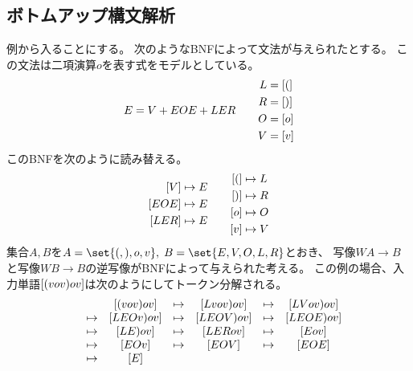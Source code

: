 \subsection{ボトムアップ構文解析}\label{s2:ボトムアップ構文解析} %
	例から入ることにする。
	次のようなBNFによって文法が与えられたとする。
	この文法は二項演算$o$を表す式をモデルとしている。
	\begin{equation*} %
		\begin{split}
			E &= V + EOE + LER \\
		\end{split} \qquad \begin{split}
			L &= \word{(} \\
			R &= \word{)} \\
			O &= \word{o} \\
			V &= \word{v} \\
		\end{split}
	\end{equation*} %
	このBNFを次のように読み替える。
	\begin{equation*} %
		\begin{split}
			\word{V} &\mapsto E \\
			\word{EOE} &\mapsto E \\
			\word{LER} &\mapsto E \\
		\end{split} \qquad \begin{split}
			\word{(} &\mapsto L \\
			\word{)} &\mapsto R \\
			\word{o} &\mapsto O \\
			\word{v} &\mapsto V
		\end{split}
	\end{equation*} %
	集合$A,B$を$A=\set{(,),o,v},\;B=\set{E,V,O,L,R}$とおき、
	写像$WA\to B$と写像$WB\to B$の逆写像がBNFによって与えられた考える。
	この例の場合、入力単語$[{(vov)ov}]$は次のようにしてトークン分解される。
	\begin{equation*}\begin{array}{ccccccc} %
		& & \word{(vov)ov} &\mapsto& \word{Lvov)ov} &\mapsto& \word{LVov)ov} \\
		&\mapsto& \word{LEOv)ov} &\mapsto& \word{LEOV)ov} 
			&\mapsto& \word{LEOE)ov} \\
		&\mapsto& \word{LE)ov} &\mapsto& \word{LERov}
			&\mapsto& \word{Eov} \\
		&\mapsto& \word{EOv} &\mapsto& \word{EOV}
			&\mapsto& \word{EOE} \\
		&\mapsto& \word{E}
	\end{array}\end{equation*} %


